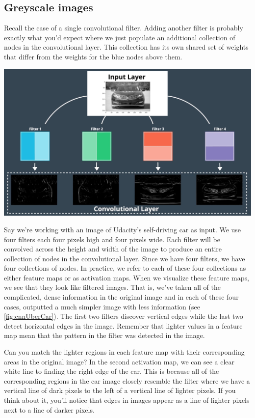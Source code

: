 \subsection{Greyscale images}
Recall the case of a single convolutional filter. Adding another filter is probably exactly what you'd expect where we just populate an additional collection of nodes in the convolutional layer. This collection has its own shared set of weights that differ from the weights for the blue nodes above them.

\includegraphics[width=0.75\linewidth]{img//cnn//depth/image2.png}
\label{fig:cnnUberCar}

Say we're working with an image of Udacity's self-driving car as input.
We use four filters each four pixels high and four pixels wide. Each filter will be convolved across the height and width of the image to produce an entire collection of nodes in the convolutional layer. Since we have four filters, we have four collections of nodes. In practice, we refer to each of these four collections as either feature maps or as activation maps. When we visualize these feature maps, we see that they look like filtered images. That is, we've taken all of the complicated, dense information in the original image and in each of these four cases, outputted a much simpler image with less information (see \autoref{fig:cnnUberCar}).
The first two filters discover vertical edges while the last two detect horizontal edges in the image.
Remember that lighter values in a feature map mean that the pattern in the filter was detected in the image. \newline

Can you match the lighter regions in each feature map with their corresponding areas in the original image? In the second activation map, we can see a clear white line to finding the right edge of the car. This is because all of the corresponding regions in the car image closely resemble
the filter where we have a vertical line of dark pixels to the left of a vertical line of lighter pixels.
If you think about it, you'll notice that edges in images appear as a line of lighter pixels next to a line of darker pixels. \newline

